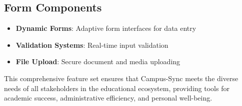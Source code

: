 \subsection{Form Components}

\begin{itemize}
    \item \textbf{Dynamic Forms}: Adaptive form interfaces for data entry
    \item \textbf{Validation Systems}: Real-time input validation
    \item \textbf{File Upload}: Secure document and media uploading
\end{itemize}

This comprehensive feature set ensures that Campus-Sync meets the diverse needs of all stakeholders in the educational ecosystem, providing tools for academic success, administrative efficiency, and personal well-being.